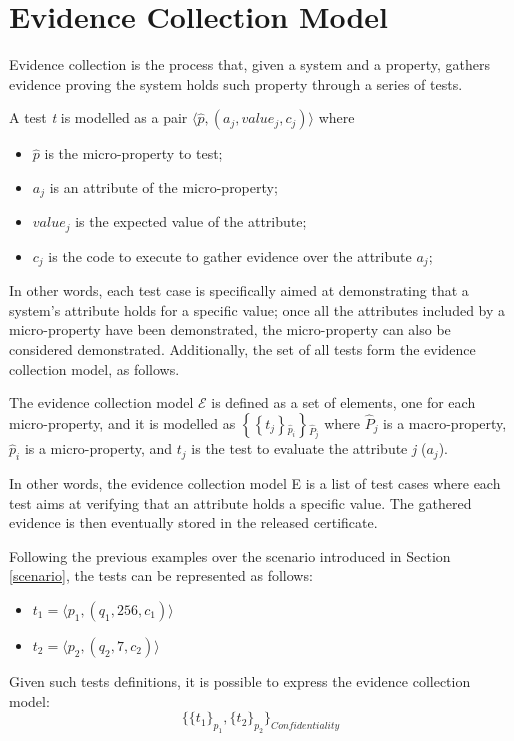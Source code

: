 \section{Evidence Collection Model}
\label{evmodel}
Evidence collection is the process that, given a system and a property, gathers evidence proving the system holds such property through a series of tests.

\begin{defn}
    A test \textit{t} is modelled as a pair \( \langle \hat{p}, \left (a_j, value_j, c_j \right ) \rangle \) where
    \begin{itemize}
        \item \( \hat{p} \) is the micro-property to test;
        \item \(a_j\) is an attribute of the micro-property;
        \item \(value_j\) is the expected value of the attribute;
        \item \(c_j\) is the code to execute to gather evidence over the attribute \(a_j\);
    \end{itemize}
\end{defn}

In other words, each test case is specifically aimed at demonstrating that a system's attribute holds for a specific value; once all the attributes included by a micro-property have been demonstrated, the micro-property can also be considered demonstrated.
Additionally, the set of all tests form the evidence collection model, as follows.

\begin{defn}
The evidence collection model \(\mathcal{E}\) is defined as a set of elements, one for each micro-property, and it is modelled as \(  \left \{ \left \{ t_j \right \} {_{\hat{p}_i}} \right \} {_{\hat{P}_j}} \) where \( \hat{P}_j \) is a macro-property, \( \hat{p}_i \) is a micro-property, and \(t_j\) is the test to evaluate the attribute \textit{j} (\(a_j\)).
\end{defn}

In other words, the evidence collection model E is a list of test cases where each test aims at verifying that an attribute holds a specific value. The gathered evidence is then eventually stored in the released certificate.

\begin{example}
Following the previous examples over the scenario introduced in Section \ref{scenario}, the tests can be represented as follows: 
\begin{itemize}
    \item \(t_1 = \langle p_1, (q_1, 256, c_1) \rangle\)
    \item \(t_2 = \langle p_2, (q_2, 7, c_2) \rangle\)
\end{itemize}
Given such tests definitions, it is possible to express the evidence collection model: 
\[\{\{t_1\}_{p_1}, \{t_2\}_{p_2}\}_{Confidentiality}\]

\end{example}

